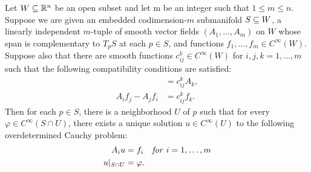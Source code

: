 \begin{theorem}\label{overdetermined linear PDE solution}
Let $W\subseteq\mathbb{R}^n$ be an open subset and let m be an integer such that $1\leq m\leq n$. Suppose we are given an embedded codimension-$m$ submanifold $S\subseteq W$, a linearly independent $m$-tuple of smooth vector fields $(A_1,\dots,A_m)$ on $W$ whose span is complementary to $T_pS$ at each $p\in S$, and functions $f_1,\dots,f_m\in C^\infty(W)$. Suppose also that there are smooth functions $c_{ij}^k\in C^\infty(W)$ for $i,j,k=1,\dots,m$ such that the following compatibility conditions are satisfied:
\begin{align}
[A_i,A_j]&=c_{ij}^kA_k,\label{overdetermined linear PDE compatibility-1}\\
A_if_j-A_jf_i&=c_{ij}^kf_k.\label{overdetermined linear PDE compatibility-2}
\end{align}
Then for each $p\in S$, there is a neighborhood $U$ of $p$ such that for every $\varphi\in C^\infty(S\cap U)$, there exists a unique solution $u\in C^\infty(U)$ to the following overdetermined Cauchy problem:
\begin{align}
A_iu&=f_i\quad\text{\textit{for} }i=1,\dots,m\label{overdetermined linear PDE equation-1}\\
u|_{S\cap U}&=\varphi\label{overdetermined linear PDE equation-2}.
\end{align}
\end{theorem}
